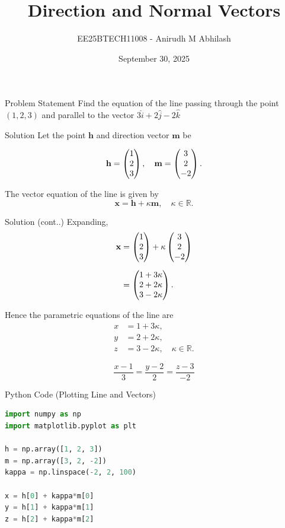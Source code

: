\documentclass{beamer}
\title{Direction and Normal Vectors}
\author{EE25BTECH11008 - Anirudh M Abhilash}
\date{September 30, 2025}
\begin{document}
\begin{frame}
\titlepage
\end{frame}

\begin{frame}{Problem Statement}
Find the equation of the line passing through the point $(1,2,3)$ and parallel to the vector $3\hat{i} + 2\hat{j} - 2\hat{k}$
\end{frame}

\begin{frame}{Solution}
Let the point $\mathbf{h}$ and direction vector $\mathbf{m}$ be  

\[
\mathbf{h} = \begin{pmatrix}1 \\ 2 \\ 3\end{pmatrix}, \quad 
\mathbf{m} = \begin{pmatrix}3 \\ 2 \\ -2\end{pmatrix}.
\]

The vector equation of the line is given by
\[
\mathbf{x} = \mathbf{h} + \kappa \mathbf{m}, \quad \kappa \in \mathbb{R}.
\]

\end{frame}

\begin{frame}{Solution (cont..)}
Expanding,  
\begin{align}
\mathbf{x} &= \begin{pmatrix}1 \\ 2 \\ 3\end{pmatrix} + \kappa \begin{pmatrix}3 \\ 2 \\ -2\end{pmatrix} \\[2mm]
           &= \begin{pmatrix}1 + 3\kappa \\ 2 + 2\kappa \\ 3 - 2\kappa\end{pmatrix}.
\end{align}

Hence the parametric equations of the line are  
\begin{align}
x &= 1 + 3\kappa, \\ 
y &= 2 + 2\kappa, \\ 
z &= 3 - 2\kappa, \quad \kappa \in \mathbb{R}.
\end{align}

\[
\boxed{\frac{x - 1}{3} = \frac{y - 2}{2} = \frac{z - 3}{-2}}
\]
\end{frame}

\begin{frame}[fragile]{Python Code (Plotting Line and Vectors)}
\begin{lstlisting}[language=Python]
import numpy as np
import matplotlib.pyplot as plt

h = np.array([1, 2, 3])
m = np.array([3, 2, -2])
kappa = np.linspace(-2, 2, 100)

x = h[0] + kappa*m[0]
y = h[1] + kappa*m[1]
z = h[2] + kappa*m[2]
\end{lstlisting}
\end{frame}
\end{document}
